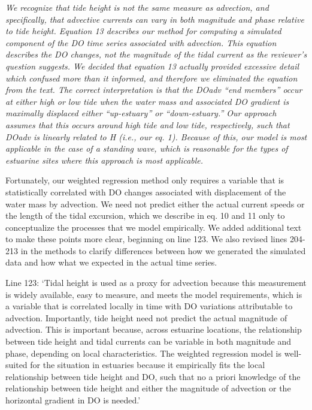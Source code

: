 \documentclass[letterpaper,12pt]{article}\usepackage[]{graphicx}\usepackage[]{color}
\begin{document}
{\it We recognize that tide height is not the same measure as advection, and specifically, that advective currents can vary in both magnitude and phase relative to tide height.  Equation 13 describes our method for computing a simulated component of the DO time series associated with advection.  This equation describes the DO changes, not the magnitude of the tidal current as the reviewer’s question suggests.  We decided that equation 13 actually provided excessive detail which confused more than it informed, and therefore we eliminated the equation from the text.  The correct interpretation is that the DOadv ``end members'' occur at either high or low tide when the water mass and associated DO gradient is maximally displaced either ``up-estuary'' or ``down-estuary.'' Our approach assumes that this occurs around high tide and low tide, respectively, such that DOadv is linearly related to H (i.e., our eq. 1). Because of this, our model is most applicable in the case of a standing wave, which is reasonable for the types of estuarine sites where this approach is most applicable.

Fortunately, our weighted regression method only requires a variable that is statistically correlated with DO changes associated with displacement of the water mass by advection.  We need not predict either the actual current speeds or the length of the tidal excursion, which we describe in eq. 10 and 11 only to conceptualize the processes that we model empirically.  We added additional text to make these points more clear, beginning on line 123. We also revised lines 204-213 in the methods to clarify differences between how we generated the simulated data and how what we expected in the actual time series.

Line 123: `Tidal height is used as a proxy for advection because this measurement is widely available, easy to measure, and meets the model requirements, which is a variable that is correlated locally in time with DO variations attributable to advection.  Importantly, tide height need not predict the actual magnitude of advection.  This is important because, across estuarine locations, the relationship between tide height and tidal currents can be variable in both magnitude and phase, depending on local characteristics.  The weighted regression model is well-suited for the situation in estuaries because it empirically fits the local relationship between tide height and DO, such that no a priori knowledge of the relationship between tide height and either the magnitude of advection or the horizontal gradient in DO is needed.'

}
\end{document}
